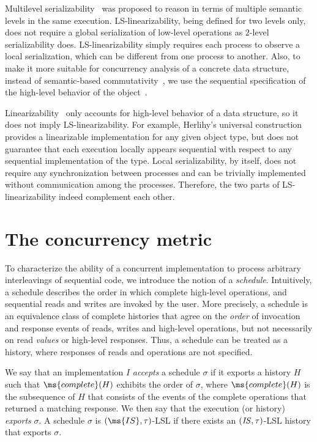 \documentclass[11pt,pdftex,letterpaper]{article}
\newcommand{\LS}{LS}
\newcommand{\id}[1]{\mbox{\textit{#1}}}\newcommand{\res}[1]{\mbox{\textbf{#1}}}
\begin{document}
Multilevel serializability~\cite{Wei86,WV02-book} was 
proposed to reason in terms of multiple semantic levels in the same execution.
\LS-linearizability, being defined for two levels only, does not require a global serialization of low-level operations as
$2$-level serializability does. 
LS-linearizability simply requires each process  to observe a local serialization, which can be different from one
process to another. Also, to make it more suitable for concurrency
analysis of a concrete data structure, instead of semantic-based commutativity~\cite{Wei88}, we use the sequential
specification of the high-level behavior of the object~\cite{HW90}.

Linearizability~\cite{HW90,AW04} only accounts for high-level
behavior of a data structure,  so it does not imply
LS-linearizability. For example, Herlihy's universal
construction~\cite{Her91} provides a linearizable implementation for
any given object type, but does not guarantee that each execution locally appears
sequential with respect to any sequential implementation of the type.    
Local serializability, by itself, does not require any synchronization
between processes and can be trivially implemented without
communication among the processes.
Therefore, the two parts of LS-linearizability indeed complement each other.  



\section{The concurrency metric}\label{sec:concurrency}
To characterize the ability of a concurrent implementation to process arbitrary interleavings of sequential code, we introduce 
the notion of a \emph{schedule}.
Intuitively, a schedule describes the order in which complete high-level
operations, and sequential reads and writes are invoked by the user. 
More precisely, a schedule is 
an equivalence class of complete histories that agree on
the \emph{order} of invocation and response events of reads, writes and high-level operations, but 
not necessarily on read \emph{values} or high-level responses.
Thus, a schedule can be treated as a history, where responses of reads and operations
are not specified. 

We say that an implementation $I$ \emph{accepts} a schedule $\sigma$ if 
it exports a history $H$ such that $\ms{complete}(H)$ exhibits
the order of $\sigma$, where $\ms{complete}(H)$ is the subsequence of $H$
that consists of the events of the complete operations that returned a matching response. 
We then say that the execution (or history) \emph{exports} $\sigma$. 
A schedule $\sigma$ is 
$(\ms{IS},\tau)$-LSL if there
exists an $(\id{IS},\tau)$-LSL history that exports $\sigma$.
\end{document}

